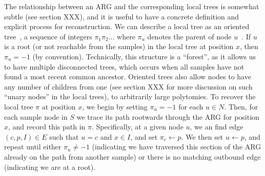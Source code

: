 \documentclass{article}
\begin{document}
The relationship between an ARG and the corresponding local trees
is somewhat subtle (see section XXX), and it is useful to have
a concrete definition and explicit process for reconstruction.
We can describe a local tree as an
oriented tree~\cite[p.\ 461]{knuth11combinatorial},
a sequence of integers $\pi_1\pi_2\dots$ where $\pi_u$ denotes the parent of
node $u$~\citep{kelleher2013coalescent,kelleher2014coalescent,kelleher2016efficient}.
If $u$ is a root
(or not reachable from the samples)
in the local tree at position $x$, then $\pi_u = -1$ (by convention).
Technically, this structure is a ``forest'', as it allows us to have
multiple disconnected trees, which occurs when all samples have not
found a most recent common ancestor. Oriented trees also allow nodes
to have  any number of children from one (see section XXX for more
discussion on such ``unary nodes'' in the local trees), to arbitrarily
large polytomies.
To recover the local tree $\pi$ at position $x$, we begin by
setting $\pi_u = -1$ for each $u\in N$. Then, for each sample
node in $S$ we trace its path rootwards through the
ARG for position $x$, and record this path in $\pi$.
Specifically, at a given node $u$,
we an find edge $(c, p, I) \in E$ such that $u = c$ and $x \in I$, and set
$\pi_c \leftarrow p$. We then set $u \leftarrow p$, and repeat
until either $\pi_u \neq -1$ (indicating we have traversed this section
of the ARG already on the path from another sample) or there
is no matching outbound edge (indicating we are at a root).
\end{document}
